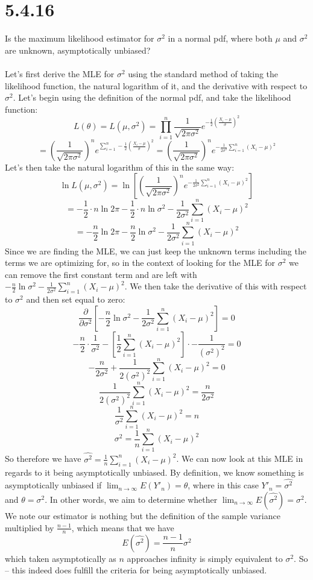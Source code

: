 \documentclass{article}
\begin{document}
{\section*{5.4.16}
Is the maximum likelihood estimator for \(\sigma^2\) in a normal pdf, where both \(\mu\) and \(\sigma^2\) are unknown, asymptotically unbiased?
\\
\\
Let's first derive the MLE for \(\sigma^2\) using the standard method of taking the likelihood function, the natural logarithm of it, and the derivative with respect to \(\sigma^2\). Let's begin using the definition of the normal pdf, and take the likelihood function:
\[
L(\theta) = L(\mu, \sigma^2) = \prod_{i=1}^{n} \frac{1}{\sqrt{2\pi\sigma^2}}e^{-\frac{1}{2}(\frac{X_i - \mu}{\sigma})^2}
\] 
\[
 = (\frac{1}{\sqrt{2\pi\sigma^2}})^n e^{\sum_{i=1}^{n} -\frac{1}{2}(\frac{X_i - \mu}{\sigma})^2} = (\frac{1}{\sqrt{2\pi\sigma^2}})^n e^{-\frac{1}{2\sigma^2} \sum_{i=1}^{n} (X_i - \mu)^2}
\]
Let's then take the natural logarithm of this in the same way: 
\[
\ln L(\mu, \sigma^2) = \ln [(\frac{1}{\sqrt{2\pi\sigma^2}})^n e^{-\frac{1}{2\sigma^2} \sum_{i=1}^{n} (X_i - \mu)^2}]
\]
\[
= -\frac{1}{2} \cdot n \ln 2 \pi - \frac{1}{2} \cdot n \ln \sigma^2 - \frac{1}{2\sigma^2} \sum_{i=1}^{n} (X_i - \mu)^2
\]
\[
= -\frac{n}{2} \ln 2 \pi - \frac{n}{2} \ln \sigma^2 - \frac{1}{2\sigma^2} \sum_{i=1}^{n} (X_i - \mu)^2
\]
Since we are finding the MLE, we can just keep the unknown terms including the terms we are optimizing for, so in the context of looking for the MLE for \(\sigma^2\) we can remove the first constant term and are left with \( -\frac{n}{2} \ln \sigma^2 - \frac{1}{2\sigma^2} \sum_{i=1}^{n} (X_i - \mu)^2 \). We then take the derivative of this with respect to \(\sigma^2\) and then set equal to zero:
\[
\frac{\partial}{\partial \sigma^2} [-\frac{n}{2} \ln \sigma^2 - \frac{1}{2\sigma^2} \sum_{i=1}^{n} (X_i - \mu)^2 ] = 0
\]
\[
-\frac{n}{2} \cdot \frac{1}{\sigma^2} - [\frac{1}{2} \sum_{i=1}^{n} (X_i - \mu)^2] \cdot -\frac{1}{(\sigma^2)^2} = 0
\]
\[
-\frac{n}{2\sigma^2} + \frac{1}{2(\sigma^2)^2} \sum_{i=1}^{n} (X_i - \mu)^2 = 0
\]
\[
\frac{1}{2(\sigma^2)^2} \sum_{i=1}^{n} (X_i - \mu)^2 = \frac{n}{2\sigma^2}
\]
\[
\frac{1}{\sigma^2} \sum_{i=1}^{n} (X_i - \mu)^2 = n
\]
\[
\sigma^2 = \frac{1}{n}\sum_{i=1}^{n} (X_i - \mu)^2
\]
So therefore we have \( \hat{\sigma^2} = \frac{1}{n}\sum_{i=1}^{n} (X_i - \mu)^2 \). We can now look at this MLE in regards to it being asymptotically unbiased. By definition, we know something is asymptotically unbiased if \(\lim_{n \to \infty} E(Y'_n) = \theta\), where in this case \(Y'_n = \hat{\sigma^2}\) and \(\theta = \sigma^2\). In other words, we aim to determine whether \( \lim_{n \to \infty} E(\hat{\sigma^2}) = \sigma^2 \). We note our estimator is nothing but the definition of the sample variance multiplied by \(\frac{n-1}{n}\), which means that we have 
\[
E(\hat{\sigma^2}) = \frac{n-1}{n} \sigma^2 
\]
which taken asymptotically as \(n\) approaches infinity is simply equivalent to \(\sigma^2\). So  -- this indeed does fulfill the criteria for being asymptotically unbiased.

}
\end{document}
